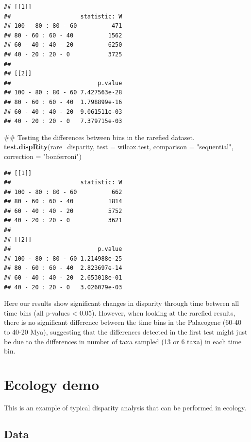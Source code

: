 \documentclass[]{book}
\newenvironment{Shaded}{\begin{snugshade}}{\end{snugshade}}
\newcommand{\KeywordTok}[1]{\textcolor[rgb]{0.13,0.29,0.53}{\textbf{#1}}}
\newcommand{\DataTypeTok}[1]{\textcolor[rgb]{0.13,0.29,0.53}{#1}}
\newcommand{\StringTok}[1]{\textcolor[rgb]{0.31,0.60,0.02}{#1}}
\newcommand{\NormalTok}[1]{#1}
\theoremstyle{definition}
\theoremstyle{definition}
\theoremstyle{remark}
\begin{document}
\begin{verbatim}
## [[1]]
##                    statistic: W
## 100 - 80 : 80 - 60          471
## 80 - 60 : 60 - 40          1562
## 60 - 40 : 40 - 20          6250
## 40 - 20 : 20 - 0           3725
## 
## [[2]]
##                         p.value
## 100 - 80 : 80 - 60 7.427563e-28
## 80 - 60 : 60 - 40  1.798899e-16
## 60 - 40 : 40 - 20  9.061511e-03
## 40 - 20 : 20 - 0   7.379715e-03
\end{verbatim}

\begin{Shaded}
\begin{Highlighting}[]
\NormalTok{## Testing the differences between bins in the rarefied dataset.}
\KeywordTok{test.dispRity}\NormalTok{(rare_disparity, }\DataTypeTok{test =}\NormalTok{ wilcox.test, }\DataTypeTok{comparison =} \StringTok{"sequential"}\NormalTok{,}
    \DataTypeTok{correction =} \StringTok{"bonferroni"}\NormalTok{)}
\end{Highlighting}
\end{Shaded}

\begin{verbatim}
## [[1]]
##                    statistic: W
## 100 - 80 : 80 - 60          662
## 80 - 60 : 60 - 40          1814
## 60 - 40 : 40 - 20          5752
## 40 - 20 : 20 - 0           3621
## 
## [[2]]
##                         p.value
## 100 - 80 : 80 - 60 1.214988e-25
## 80 - 60 : 60 - 40  2.823697e-14
## 60 - 40 : 40 - 20  2.653018e-01
## 40 - 20 : 20 - 0   3.026079e-03
\end{verbatim}

Here our results show significant changes in disparity through time
between all time bins (all p-values \textless{} 0.05). However, when
looking at the rarefied results, there is no significant difference
between the time bins in the Palaeogene (60-40 to 40-20 Mya), suggesting
that the differences detected in the first test might just be due to the
differences in number of taxa sampled (13 or 6 taxa) in each time bin.

\chapter{Ecology demo}\label{ecology-demo}

This is an example of typical disparity analysis that can be performed
in ecology.

\section{Data}\label{data}
\end{document}
